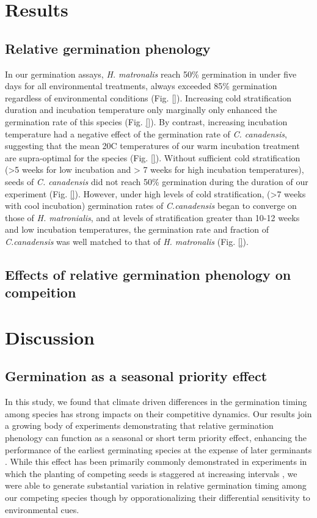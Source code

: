 \documentclass{article}\usepackage[]{graphicx}\usepackage[]{color}
\begin{document}
\section*{Results}
\subsection*{Relative germination phenology}
In our germination assays, \textit{H. matronalis} reach 50\% germination in under five days for all environmental treatments, always exceeded 85\% germination regardless of environmental conditions (Fig. \ref{}). Increasing cold stratification duration and incubation temperature only marginally only enhanced the germination rate of this species (Fig. \ref{}). By contrast, increasing incubation temperature had a negative effect of the germination rate of \textit{C. canadensis}, suggesting that the mean 20\degree C temperatures of our warm incubation treatment are supra-optimal for the species (Fig. \ref{}). Without sufficient cold stratification (>5 weeks for low incubation and > 7 weeks for high incubation temperatures), seeds of  \textit{C. canadensis} did not reach 50\% germination during the duration of our experiment (Fig. \ref{}). However, under high levels of cold stratification, (>7 weeks with cool incubation) germination rates of \textit{C.canadensis} began to converge on those of \textit{H. matronialis}, and at levels of stratification greater than 10-12 weeks and low incubation temperatures, the germination rate and fraction of \textit{C.canadensis} was well matched to that of \textit{H. matronalis} (Fig. \ref{}).

\subsection*{Effects of relative germination phenology on compeition}

\section*{Discussion}
\subsection*{Germination as a seasonal priority effect} 
In this study, we found that climate driven differences in the germination timing among species has strong impacts on their competitive dynamics. Our results join a growing body of experiments demonstrating that relative germination phenology can function as a seasonal or short term priority effect, enhancing the performance of the earliest germinating species at the expense of later germinants \citep{}. While this effect has been primarily commonly demonstrated in experiments in which the planting of competing seeds is staggered at increasing intervals \citep{}, we were able to generate substantial variation in relative germination timing among our competing species though by opporationalizing their differential sensitivity to environmental cues. 
\end{document}
